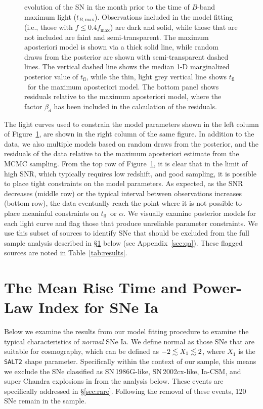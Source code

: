 \documentclass[twocolumn]{./aastex63}
\newcommand{\tfl}{$t_\mathrm{fl}$}
\newcommand{\tbmax}{$t_{B,\mathrm{max}}$}
\begin{document}
\begin{figure}
{    evolution of the SN in the month prior to the time of $B$-band maximum
    light (\tbmax). Observations included in the model fitting (i.e., those
    with $f \le 0.4 f_\mathrm{max}$) are dark and solid, while those that are
    not included are faint and semi-transparent. The maximum aposteriori
    model is shown via a thick solid line, while random draws from the
    posterior are shown with semi-transparent dashed lines. The vertical
    dashed line shows the median 1-D marginalized posterior value of \tfl,
    while the thin, light grey vertical line shows \tfl\ for the maximum
    aposteriori model. The bottom panel shows residuals relative to the
    maximum aposteriori model, where the factor $\beta_d$ has been included
    in the calculation of the residuals.}
    \label{fig:corner_LC}
\end{figure}

The light curves used to constrain the model parameters shown in the left
column of Figure~\ref{fig:corner_LC}, are shown in the right column of the
same figure. In addition to the data, we also multiple models based on random
draws from the posterior, and the residuals of the data relative to the
maximum aposteriori estimate from the MCMC sampling. From the top row of
Figure~\ref{fig:corner_LC}, it is clear that in the limit of high SNR, which
typically requires low redshift, and good sampling, it is possible to place
tight constraints on the model parameters. As expected, as the SNR decreases
(middle row) or the typical interval between observations increases (bottom
row), the data eventually reach the point where it is not possible to place
meaninful constraints on \tfl\ or $\alpha$. We visually examine posterior
models for each light curve and flag those that produce unreliable parameter
constraints. We use this subset of sources to identify SNe that should be
excluded from the full sample analysis described in \S\ref{sec:mean_parameters}
below (see Appendix~\ref{sec:qa}). These flagged sources are noted in
Table~\ref{tab:results}.

\section{The Mean Rise Time and Power-Law Index for SNe
Ia}\label{sec:mean_parameters}

Below we examine the results from our model fitting procedure to examine the
typical characteristics of \textit{normal} SNe Ia. We define normal as those
SNe that are suitable for cosmography, which can be
defined as $-2 \lesssim X_1 \lesssim 2$, where $X_1$ is the \texttt{SALT2} shape
parameter. Specifically within the context of our sample, this means we
exclude the SNe classified as SN\,1986G-like, SN\,2002cx-like, Ia-CSM, and
super Chandra explosions in \citet{Yao19} from the analysis below. These
events are specifically addressed in \S\ref{sec:rare}. Following the removal
of these events, 120 SNe remain in the sample.
\end{document}
